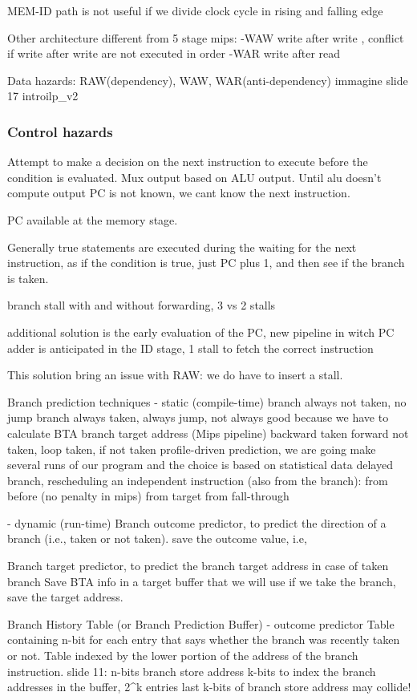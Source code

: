 MEM-ID path is not useful if we divide clock cycle in rising and falling edge

Other architecture different from 5 stage mips:
-WAW write after write , conflict if write after write are not executed in order
-WAR write after read

Data hazards: RAW(dependency), WAW, WAR(anti-dependency)
immagine slide 17 introilp_v2

\subsubsection{Control hazards}
Attempt to make a decision on the next instruction to execute before the condition is evaluated.
Mux output based on ALU output.
Until alu doesn't compute output PC is not known, we cant know the next instruction.

PC available at the memory stage.

Generally true statements are executed during the waiting for the next instruction, as if the condition is true, just PC plus 1, and then see if the branch is taken.

branch stall with and without forwarding, 3 vs 2 stalls

additional solution is the early evaluation of the PC, new pipeline in witch PC adder is anticipated in the ID stage, 1
stall to fetch the correct instruction

This solution bring an issue with RAW: we do have to insert a stall.

Branch prediction techniques
- static (compile-time)
branch always not taken, no jump
branch always taken, always jump, not always good because we have to calculate BTA branch target address (Mips pipeline)
backward taken forward not taken, loop taken, if not taken
profile-driven prediction, we are going make several runs of our program and the choice is based on statistical data
delayed branch, rescheduling an independent instruction (also from the branch):
    from before (no penalty in mips)
    from target
    from fall-through


- dynamic (run-time)
Branch outcome predictor, to predict the direction of a branch (i.e., taken or not taken).
save the outcome value, i.e,

Branch target predictor, to predict the branch target address in case of taken branch
Save BTA info in a target buffer that  we will use if we take the branch, save the target address.


Branch History Table (or Branch Prediction Buffer) - outcome predictor
Table containing n-bit for each entry that says whether the branch was recently taken or not.
Table indexed by the lower portion of the address of the branch instruction.
slide 11:
n-bits branch store address
k-bits to index the branch addresses in the buffer, 2^k entries
last k-bits of branch store address may collide!

